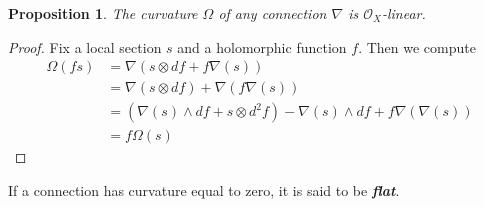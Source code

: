 \documentclass[psamsfonts, 12pt]{amsart}
\newtheorem{prop}[thm]{Proposition}
\theoremstyle{definition}
\theoremstyle{remark}
\renewcommand{\O}{\mathcal{O}}
\newcommand{\ib}[1]{\textbf{\textit{#1}}}
\begin{document}
%
\begin{prop}
The curvature $\Omega$ of any connection $\nabla$ is $\O_X$-linear.
\end{prop}
%
\begin{proof}
Fix a local section $s$ and a holomorphic function $f$. Then we compute
\begin{align*}
\Omega(fs) &= \nabla(s \otimes df + f\nabla(s)) \\
&= \nabla(s \otimes df) + \nabla(f\nabla(s)) \\
&= (\nabla(s) \wedge df + s \otimes d^2f) - \nabla(s)\wedge df + f\nabla(\nabla(s)) \\
&= f\Omega(s)
\end{align*}
\end{proof}
%
If a connection has curvature equal to zero, it is said to be \ib{flat}. \\
\end{document}
